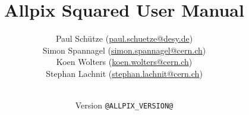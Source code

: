 \newcommand{\addlicense}{
\begin{table}[H]
\centering
\renewcommand{\arraystretch}{1.5}%
\begin{tabular}{>{\centering\arraybackslash}m{.10\textwidth}>{\raggedright\arraybackslash}m{.90\textwidth}}
 \Large{\ccby} & \footnotesize{This manual is licensed under the Creative Commons Attribution 4.0 International License.
 \newline To view a copy of this license, visit \url{http://creativecommons.org/licenses/by/4.0/}.} \\
\end{tabular}
\end{table}
}




\titlehead{\centering\texttt{[image: @DOCS\_ALLPIX\_LOGO@]}}
\title{\textbf{Allpix Squared} User Manual}
\author{
  Paul Schütze (\href{mailto:paul.schuetze@desy.de}{paul.schuetze@desy.de})\\
  Simon Spannagel (\href{mailto:simon.spannagel@cern.ch}{simon.spannagel@cern.ch})\\
  Koen Wolters (\href{mailto:koen.wolters@cern.ch}{koen.wolters@cern.ch})\\
  Stephan Lachnit (\href{mailto:stephan.lachnit@cern.ch}{stephan.lachnit@cern.ch})
}
\date{\\ \vspace{10pt} Version \lstinline!@ALLPIX_VERSION@!}
